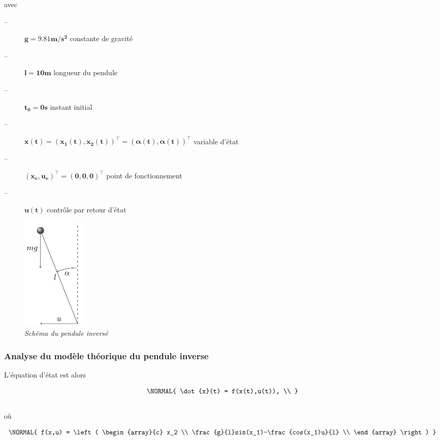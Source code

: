 \documentclass[11pt,french]{article} %
\begin{document}
\quad avec

\begin{description}
	\item[--] $\mathbf{g = 9.81 m/s^2}$ constante de gravité
	\item[--] $\mathbf{l = 10 m}$ longueur du pendule
	\item[--] $\mathbf{t_0 = 0 s}$ instant initial
	\item[--] $\boldsymbol{x(t) = (x_1(t), x_2(t))^\intercal = (\alpha(t), \dot\alpha(t))^\intercal}$ variable d'état 
	\item[--] $\boldsymbol{(x_e,u_e)^\intercal = (0,0,0)^\intercal}$ point de fonctionnement
	\item[--] $\boldsymbol{u(t)}$ contrôle par retour d'état
\end{description}

\begin{figure}[h]
    \centering
		\advance\leftskip-0.2cm
    \includegraphics[width=3cm]{pendule_inverse.png}
		\caption{\textit{Schéma du pendule inversé}}
		\label{fig:schema_pend_inv}
\end{figure}
\vspace{0.5cm}

\subsubsection{Analyse du modèle théorique du pendule inverse}

\quad L'équation d'état est alors

\begin{equation}
	\NORMAL{
			\dot{x}(t) = f(x(t),u(t)), \\
	}
\end{equation}\\

\quad où 

\begin{equation}
	\NORMAL{
		f(x,u) = 
		\left(
		\begin{array}{c}
			x_2 \\
			\frac{g}{l}sin(x_1)-\frac{cos(x_1)u}{l} \\
    \end{array}
  \right)
	}
\end{equation}\\
\end{document}
